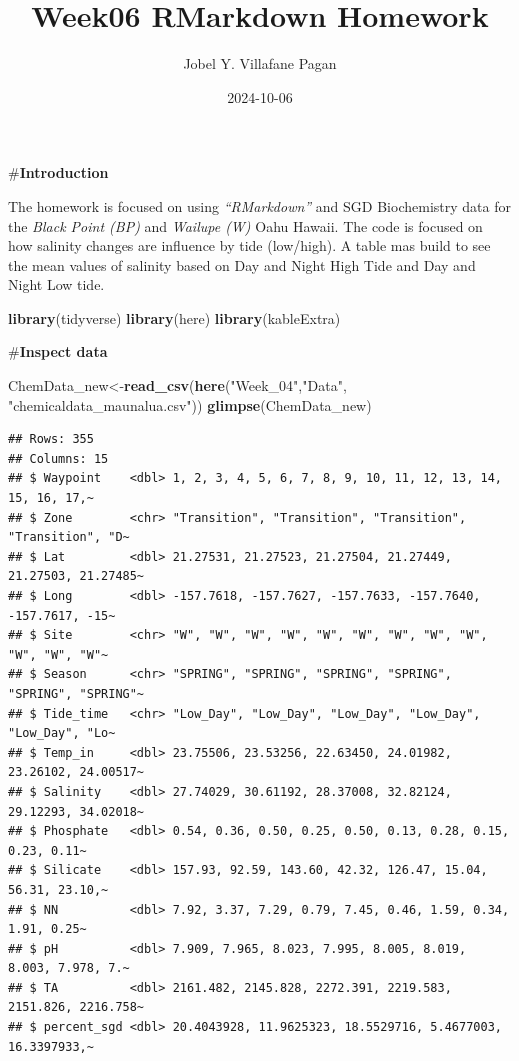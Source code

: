 \documentclass[
]{article}
\title{Week06 RMarkdown Homework}
\author{Jobel Y. Villafane Pagan}
\date{2024-10-06}
\newenvironment{Shaded}{\begin{snugshade}}{\end{snugshade}}
\newcommand{\FunctionTok}[1]{\textcolor[rgb]{0.13,0.29,0.53}{\textbf{#1}}}
\newcommand{\NormalTok}[1]{#1}
\newcommand{\OtherTok}[1]{\textcolor[rgb]{0.56,0.35,0.01}{#1}}
\newcommand{\StringTok}[1]{\textcolor[rgb]{0.31,0.60,0.02}{#1}}
\begin{document}
\maketitle

\#\textbf{Introduction}

The homework is focused on using \emph{``RMarkdown''} and SGD
Biochemistry data for the \emph{Black Point (BP)} and \emph{Wailupe (W)}
Oahu Hawaii. The code is focused on how salinity changes are influence
by tide (low/high). A table mas build to see the mean values of salinity
based on Day and Night High Tide and Day and Night Low tide.

\begin{Shaded}
\begin{Highlighting}[]
\FunctionTok{library}\NormalTok{(tidyverse)}
\FunctionTok{library}\NormalTok{(here)}
\FunctionTok{library}\NormalTok{(kableExtra)}
\end{Highlighting}
\end{Shaded}

\#\textbf{Inspect data}

\begin{Shaded}
\begin{Highlighting}[]
\NormalTok{ChemData\_new}\OtherTok{\textless{}{-}}\FunctionTok{read\_csv}\NormalTok{(}\FunctionTok{here}\NormalTok{(}\StringTok{"Week\_04"}\NormalTok{,}\StringTok{"Data"}\NormalTok{, }\StringTok{"chemicaldata\_maunalua.csv"}\NormalTok{))}
\FunctionTok{glimpse}\NormalTok{(ChemData\_new)}
\end{Highlighting}
\end{Shaded}

\begin{verbatim}
## Rows: 355
## Columns: 15
## $ Waypoint    <dbl> 1, 2, 3, 4, 5, 6, 7, 8, 9, 10, 11, 12, 13, 14, 15, 16, 17,~
## $ Zone        <chr> "Transition", "Transition", "Transition", "Transition", "D~
## $ Lat         <dbl> 21.27531, 21.27523, 21.27504, 21.27449, 21.27503, 21.27485~
## $ Long        <dbl> -157.7618, -157.7627, -157.7633, -157.7640, -157.7617, -15~
## $ Site        <chr> "W", "W", "W", "W", "W", "W", "W", "W", "W", "W", "W", "W"~
## $ Season      <chr> "SPRING", "SPRING", "SPRING", "SPRING", "SPRING", "SPRING"~
## $ Tide_time   <chr> "Low_Day", "Low_Day", "Low_Day", "Low_Day", "Low_Day", "Lo~
## $ Temp_in     <dbl> 23.75506, 23.53256, 22.63450, 24.01982, 23.26102, 24.00517~
## $ Salinity    <dbl> 27.74029, 30.61192, 28.37008, 32.82124, 29.12293, 34.02018~
## $ Phosphate   <dbl> 0.54, 0.36, 0.50, 0.25, 0.50, 0.13, 0.28, 0.15, 0.23, 0.11~
## $ Silicate    <dbl> 157.93, 92.59, 143.60, 42.32, 126.47, 15.04, 56.31, 23.10,~
## $ NN          <dbl> 7.92, 3.37, 7.29, 0.79, 7.45, 0.46, 1.59, 0.34, 1.91, 0.25~
## $ pH          <dbl> 7.909, 7.965, 8.023, 7.995, 8.005, 8.019, 8.003, 7.978, 7.~
## $ TA          <dbl> 2161.482, 2145.828, 2272.391, 2219.583, 2151.826, 2216.758~
## $ percent_sgd <dbl> 20.4043928, 11.9625323, 18.5529716, 5.4677003, 16.3397933,~
\end{verbatim}
\end{document}
